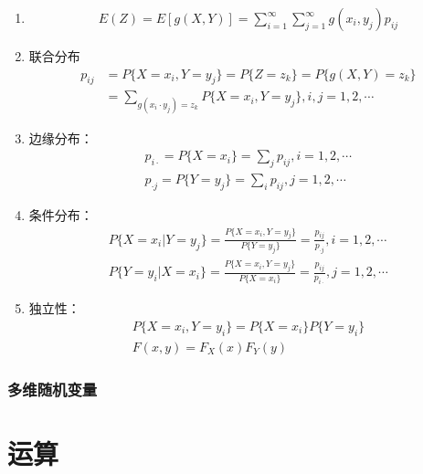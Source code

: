 \documentclass[12pt]{book}
\begin{document}
\begin{enumerate}[1.]
    \item \begin{gather*}
        E(Z) = E[g(X,Y)] 
        = \sum_{i=1}^{\infty}\sum_{j=1}^{\infty}{g(x_i,y_j)p_{ij}}
    \end{gather*}
    \item 联合分布
    \begin{align*}
        p_{ij} &= P\{X=x_i,Y=y_j\} 
        = P\{Z=z_{k}\}
        = P\{ g(X,Y)=z_{k} \} \\
        &= \sum_{g(x_i\cdot y_j)=z_k}{ P\{X=x_i,Y=y_j\} } , i,j=1,2,\cdots
    \end{align*}
    \item 边缘分布：
    \begin{gather*}
        p_{i\cdot} 
        = P\{X=x_i\}
        = \sum_{j}{p_{ij}}, i=1,2,\cdots \\
        p_{\cdot j} 
        = P\{Y=y_j\}
        = \sum_{i}{p_{ij}} , j=1,2,\cdots
    \end{gather*}
    \item 条件分布：
    \begin{gather*}
        P\{X=x_i|Y=y_j\}
        = \frac{P\{X=x_i, Y=y_j\}}{P\{Y=y_j\}}
        = \frac{p_{ij}}{p_{\cdot j}}, i=1,2,\cdots \\
        P\{Y=y_i|X=x_i\}
        = \frac{P\{X=x_i, Y=y_j\}}{P\{X=x_i\}}
        = \frac{p_{ij}}{p_{i\cdot}}, j=1,2,\cdots
    \end{gather*}
    \item 独立性：
          \begin{gather*}
              P\{X=x_i,Y=y_i\} 
              = P\{X=x_i\} P\{Y=y_i\} \\
              F(x,y)=F_{X}(x) F_{Y}(y)
          \end{gather*}
\end{enumerate}




\subsubsection{多维随机变量}







\section{运算}
\end{document}
